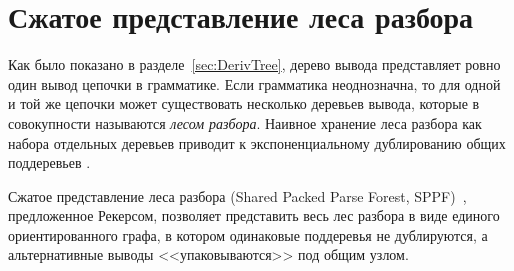\section{Сжатое представление леса разбора}
\label{sec:SPPF}

Как было показано в разделе~\ref{sec:DerivTree}, дерево вывода представляет ровно один вывод цепочки в грамматике.
Если грамматика неоднозначна, то для одной и той же цепочки может существовать несколько деревьев вывода, которые в совокупности называются \emph{лесом разбора}.
Наивное хранение леса разбора как набора отдельных деревьев приводит к экспоненциальному дублированию общих поддеревьев%
%
.

Сжатое представление леса разбора (Shared Packed Parse Forest, SPPF)~, предложенное Рекерсом, позволяет представить весь лес разбора в виде единого ориентированного графа, в котором одинаковые поддеревья не дублируются, а альтернативные выводы <<упаковываются>> под общим узлом.

